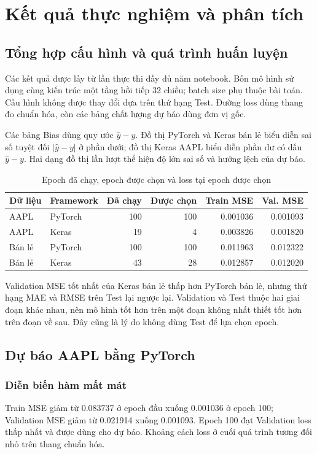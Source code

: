 \documentclass[12pt,a4paper]{report}
\begin{document}
\chapter{Kết quả thực nghiệm và phân tích}
\label{chap:results}

\section{Tổng hợp cấu hình và quá trình huấn luyện}
Các kết quả được lấy từ lần thực thi đầy đủ năm notebook. Bốn mô hình sử dụng cùng kiến trúc một tầng hồi tiếp 32 chiều; batch size phụ thuộc bài toán. Cấu hình không được thay đổi dựa trên thứ hạng Test. Đường loss dùng thang đo chuẩn hóa, còn các bảng chất lượng dự báo dùng đơn vị gốc.

Các bảng Bias dùng quy ước $\widehat y-y$. Đồ thị PyTorch và Keras bán lẻ biểu diễn sai số tuyệt đối $|\widehat y-y|$ ở phần dưới; đồ thị Keras AAPL biểu diễn phần dư có dấu $\widehat y-y$. Hai dạng đồ thị lần lượt thể hiện độ lớn sai số và hướng lệch của dự báo.

\begin{table}[H]\centering\small
\setlength{\tabcolsep}{4pt}
\caption{Epoch đã chạy, epoch được chọn và loss tại epoch được chọn}\label{tab:training}
\begin{tabular}{@{}llrrrr@{}}\toprule
Dữ liệu & Framework & Đã chạy & Được chọn & Train MSE & Val. MSE \\\midrule
AAPL & PyTorch & 100 & 100 & 0.001036 & 0.001093 \\
AAPL & Keras & 19 & 4 & 0.003826 & 0.001820 \\
Bán lẻ & PyTorch & 100 & 100 & 0.011963 & 0.012322 \\
Bán lẻ & Keras & 43 & 28 & 0.012857 & 0.012020 \\
\bottomrule\end{tabular}
\end{table}

Validation MSE tốt nhất của Keras bán lẻ thấp hơn PyTorch bán lẻ, nhưng thứ hạng MAE và RMSE trên Test lại ngược lại. Validation và Test thuộc hai giai đoạn khác nhau, nên mô hình tốt hơn trên một đoạn không nhất thiết tốt hơn trên đoạn về sau. Đây cũng là lý do không dùng Test để lựa chọn epoch.

\section{Dự báo AAPL bằng PyTorch}
\subsection{Diễn biến hàm mất mát}
Train MSE giảm từ 0.083737 ở epoch đầu xuống 0.001036 ở epoch 100; Validation MSE giảm từ 0.021914 xuống 0.001093. Epoch 100 đạt Validation loss thấp nhất và được dùng cho dự báo. Khoảng cách loss ở cuối quá trình tương đối nhỏ trên thang chuẩn hóa.
\end{document}
